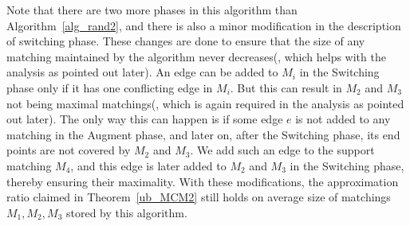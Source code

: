 \documentclass[11pt]{article}
\begin{document}
Note that there are two more phases in this algorithm than Algorithm~\ref{alg_rand2}, and there is also a minor modification in the description of switching phase. These changes are done to ensure that the size of any matching maintained by the algorithm never decreases(, which helps with the analysis as pointed out later). An edge can be added to $M_i$ in the Switching phase only if it has one conflicting edge in $M_i$. But this can result in $M_2$ and $M_3$ not being maximal matchings(, which is again required in the analysis as pointed out later). The only way this can happen is if some edge $e$ is not added to any matching in the Augment phase, and later on, after the Switching phase, its end points are not covered by $M_2$ and $M_3$. We add such an edge to the support matching $M_4$, and this edge is later added to $M_2$ and $M_3$ in the Switching phase, thereby ensuring their maximality. With these modifications, the approximation ratio claimed in Theorem~\ref{ub_MCM2} still holds on average size of matchings $M_1,M_2,M_3$ stored by this algorithm.
\end{document}
